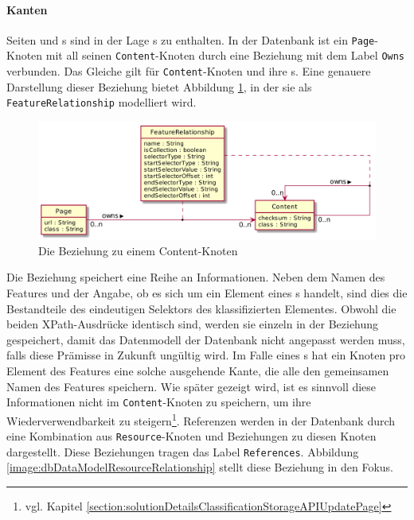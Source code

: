     \paragraph{Kanten}
    Seiten und {\contentFeature}s sind in der Lage {\contentFeature}s zu enthalten.
    In der Datenbank ist ein \texttt{Page}-Knoten mit all seinen \texttt{Content}-Knoten
    durch eine Beziehung mit dem Label \texttt{Owns} verbunden.
    Das Gleiche gilt für \texttt{Content}-Knoten und ihre {\childFeature}s.
    Eine genauere Darstellung dieser Beziehung bietet Abbildung \ref{image:dbDataModelContentRelationship},
    in der sie als \texttt{FeatureRelationship} modelliert wird.

    \begin{figure}
        \centering
        \includegraphics[scale=\imageScalingFactor]{../resources/db-data-model/content-relationship.png}
        \caption{Die Beziehung zu einem Content-Knoten}
        \label{image:dbDataModelContentRelationship}
    \end{figure}

    Die Beziehung speichert eine Reihe an Informationen.
    Neben dem Namen des Features und der Angabe,
    ob es sich um ein Element eines {\collectionFeature}s handelt,
    sind dies die Bestandteile des eindeutigen Selektors des
    klassifizierten Elementes.
    Obwohl die beiden XPath-Ausdrücke identisch sind,
    werden sie einzeln in der Beziehung gespeichert, damit das Datenmodell der Datenbank
    nicht angepasst werden muss, falls diese Prämisse in Zukunft ungültig wird.
    Im Falle eines {\collectionFeature}s hat ein Knoten pro Element des Features eine solche
    ausgehende Kante, die alle den gemeinsamen Namen des Features speichern.
    Wie später gezeigt wird, ist es sinnvoll diese Informationen nicht im \texttt{Content}-Knoten
    zu speichern, um ihre Wiederverwendbarkeit zu
    steigern\footnote{vgl. Kapitel \ref{section:solutionDetailsClassificationStorageAPIUpdatePage}}.
    Referenzen werden in der Datenbank durch eine Kombination aus
    \texttt{Resource}-Knoten und Beziehungen zu diesen Knoten dargestellt.
    Diese Beziehungen tragen das Label \texttt{References}.
    Abbildung \ref{image:dbDataModelResourceRelationship} stellt diese Beziehung in den Fokus.

